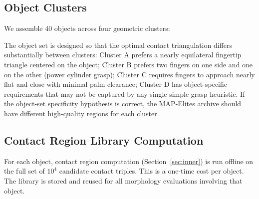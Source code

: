\documentclass[journal]{IEEEtran}
\begin{document}
\subsection{Object Clusters}

We assemble 40 objects across four geometric clusters:

\begin{table}[t]
  \centering
  \caption{Object Benchmark Clusters}
  \label{tab:objects}
\end{table}

The object set is designed so that the optimal contact triangulation differs substantially
between clusters: Cluster A prefers a nearly equilateral fingertip triangle centered on
the object; Cluster B prefers two fingers on one side and one on the other (power cylinder
grasp); Cluster C requires fingers to approach nearly flat and close with minimal palm
clearance; Cluster D has object-specific requirements that may not be captured by any
single simple grasp heuristic.
If the object-set specificity hypothesis is correct, the MAP-Elites archive should have
different high-quality regions for each cluster.

\subsection{Contact Region Library Computation}

For each object, contact region computation (Section~\ref{sec:inner}) is run offline
on the full set of $10^4$ candidate contact triples.
This is a one-time cost per object.
The library is stored and reused for all morphology evaluations involving that object.
\end{document}
